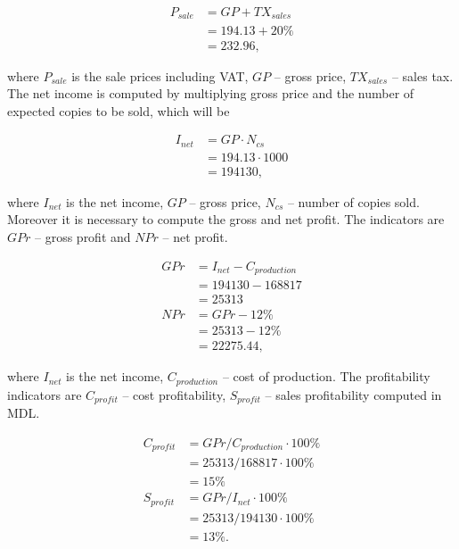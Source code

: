 \begin{equation}
 \begin{split}
  P_{sale} &= GP + TX_{sales}\\
              &= 194.13  + 20\% \\
              &= 232.96,
 \end{split}
\end{equation}

\noindent
where $P_{sale}$ is the sale prices including VAT, $GP$ -- gross price, $TX_{sales}$ -- sales tax. The net income is computed by multiplying gross price and the number of expected copies to be sold, which will be

\begin{equation}
 \begin{split}
  I_{net} &= GP \cdot N_{cs}\\
              &= 194.13  \cdot 1000 \\
              &= 194130,
 \end{split}
\end{equation}

\noindent
where $I_{net}$ is the net income, $GP$ -- gross price, $N_{cs}$ -- number of copies sold. Moreover it is necessary to compute the gross and net profit. The indicators are $GPr$ -- gross profit and $NPr$ -- net profit.

\begin{equation}
 \begin{split}
  GPr &= I_{net} - C_{production}\\
              &= 194130 - 168817\\ 
              &= 25313\\              
  NPr &= GPr - 12\% \\
             &= 25313 - 12\% \\
             &= 22275.44,
 \end{split}
\end{equation}

\noindent
where $I_{net}$ is the net income, $C_{production}$ -- cost of production. The profitability indicators are $C_{profit}$ -- cost profitability, $S_{profit}$ -- sales profitability computed in MDL.

\begin{equation}
 \begin{split}
  C_{profit} &= GPr / C_{production} \cdot 100\%\\
              &= 25313 / 168817 \cdot 100\% \\
              &= 15 \%\\              
  S_{profit} &= GPr / I_{net} \cdot 100\% \\
             &= 25313 / 194130 \cdot 100\% \\
             &= 13 \%.
 \end{split}
\end{equation}

